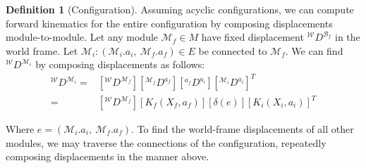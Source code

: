 \documentclass[conference]{IEEEtran}
\theoremstyle{definition}
\newtheorem{definition}{Definition}[section]
\begin{document}
\begin{definition}[Configuration]
 Assuming acyclic configurations, we can compute forward kinematics for the entire
configuration by composing displacements module-to-module. Let any module \(\mathcal{M}_f \in M\) have
fixed displacement \({^\mathcal{W}}D^{\mathcal{B}_f}\) in the world frame.
Let \(\mathcal{M}_i: (\mathcal{M}_i.a_i,~\mathcal{M}_f.a_f) \in E \) be connected to \(\mathcal{M}_f\).
 We can find \({^\mathcal{W}}D^{\mathcal{M}_i}\) by composing displacements as follows:
\begin{align*}
{^\mathcal{W}}D^{\mathcal{M}_i} =& [{^\mathcal{W}}D^{\mathcal{M}_f}] [{^{\mathcal{M}_f}}D^{a_f}][
{^{a_f}}D^{a_i}] [{^{\mathcal{M}_i}}D^{a_i}]^T \\
=& [{^\mathcal{W}}D^{\mathcal{M}_f}] [K_f(X_f,a_f)] [\delta(e)] [K_i(X_i,a_i)]^T
\end{align*}

Where \(e=(\mathcal{M}_i.a_i,~\mathcal{M}_f.a_f)\). To find the world-frame displacements
of all other modules, we may traverse the connections of the configuration,  repeatedly
composing displacements in the manner above.
\end{definition}
\end{document}

